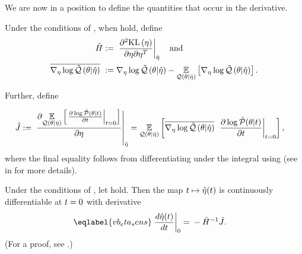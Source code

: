 We are now in a position to define the quantities that occur in the derivative.

\begin{defn}
%
Under the conditions of , when  hold, define
%
\begin{align*}
%
\hessopt :={}& \fracat{\partial^2 \KL{\eta}}
                      {\partial \eta \partial \eta^T}
                      {\etaopt} \mathand \\
%
\lqgradbar{\theta \vert \etaopt} :={}&
    \lqgrad{\theta \vert \etaopt} -
    \expect{\q(\theta \vert \etaopt)}{\lqgrad{\theta \vert \etaopt}}.
%
\end{align*}


Further, define

\begin{align*}
%
\crosshessian :={}&
    \fracat{\partial
            \expect{\q(\theta \vert \etaopt)}
                   {\fracat{\partial \log \ptil(\theta \vert \t)}
                           {\partial \t}{\t=0} }
            }
        {\partial \eta}{\etaopt}
={}
    \expect{\q(\theta \vert \etaopt)}{
          \lqgradbar{\theta \vert \etaopt}
          \fracat{\partial \log \ptil(\theta \vert \t)}
                 {\partial \t}{\t=0}},
%
\end{align*}
%
where the final equality follows from differentiating under the integral using
 (see  in  for
more details).
%
\end{defn}


\begin{thm}
%
Under the conditions of , let
 hold.   Then the map $t \mapsto
\hat\eta(t)$ is continuously differentiable at $t=0$ with derivative
%
\begin{align}\eqlabel{vb_eta_sens}
%
\fracat{d \etaopt(\t)}{d \t}{0} ={}&
    - \hessopt^{-1} \crosshessian.
%
\end{align}
%
(For a proof, see  .)
%
\end{thm}
